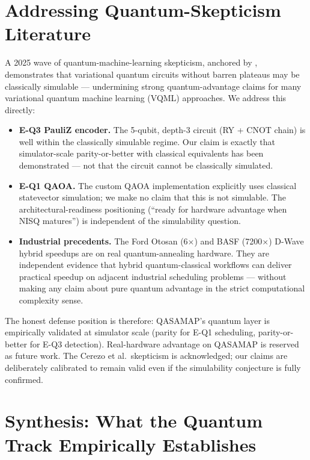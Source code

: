 \section{Addressing Quantum-Skepticism Literature}
\label{sec:quantum-skepticism}

A 2025 wave of quantum-machine-learning skepticism, anchored by \cite{cerezo2025bp}, demonstrates that variational quantum circuits without barren plateaus may be classically simulable --- undermining strong quantum-advantage claims for many variational quantum machine learning (VQML) approaches. We address this directly:

\begin{itemize}
    \item \textbf{E-Q3 PauliZ encoder.} The 5-qubit, depth-3 circuit (RY + CNOT chain) is well within the classically simulable regime. Our claim is exactly that simulator-scale parity-or-better with classical equivalents has been demonstrated --- not that the circuit cannot be classically simulated.
    \item \textbf{E-Q1 QAOA.} The custom QAOA implementation explicitly uses classical statevector simulation; we make no claim that this is not simulable. The architectural-readiness positioning (``ready for hardware advantage when NISQ matures'') is independent of the simulability question.
    \item \textbf{Industrial precedents.} The Ford Otosan (6$\times$) and BASF (7200$\times$) D-Wave hybrid speedups are on real quantum-annealing hardware. They are independent evidence that hybrid quantum-classical workflows can deliver practical speedup on adjacent industrial scheduling problems --- without making any claim about pure quantum advantage in the strict computational complexity sense.
\end{itemize}

The honest defense position is therefore: QASAMAP's quantum layer is empirically validated at simulator scale (parity for E-Q1 scheduling, parity-or-better for E-Q3 detection). Real-hardware advantage on QASAMAP is reserved as future work. The Cerezo et al.\ skepticism is acknowledged; our claims are deliberately calibrated to remain valid even if the simulability conjecture is fully confirmed.

\section{Synthesis: What the Quantum Track Empirically Establishes}

